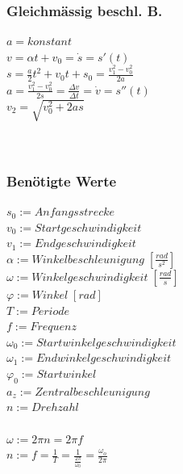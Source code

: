 \begin{multicols}{3}
	\subsubsection{Gleichmässig beschl. B.}
	$a = konstant$ \\
	$v = \alpha t + v_{0} = \dot s = s'(t)$ \\
	$s = \frac{a}{2}t^2 + v_{0}t + s_{0} = \frac{v_{1}^2 - v_{0}^2}{2a}$ \\
	$a = \frac{v_{1}^2 - v_{0}^2}{2s} = \frac{\Delta v}{\Delta t} = \dot v = s''(t)$ \\
	$v_{2} = \sqrt{v_{0}^2 + 2as}$ \\
	\\
	\\
\columnbreak
	\subsubsection{Benötigte Werte}
	$s_{0}:= Anfangsstrecke$ \\
	$v_{0}:= Startgeschwindigkeit$ \\
	$v_{1}:= Endgeschwindigkeit$ \\
	$\alpha:= Winkelbeschleunigung \; [\frac{rad}{s^2}]$ \\
	$\omega:= Winkelgeschwindigkeit \; [\frac{rad}{s}]$ \\
	$\varphi:= Winkel \; [rad]$ \\
	$T:= Periode $\\
	$f:= Frequenz $\\
	$\omega_{0} := Startwinkelgeschwindigkeit $ \\
	$\omega_{1} := Endwinkelgeschwindigkeit $ \\
	$\varphi_{0} := Startwinkel $ \\
	$a_{z} := Zentralbeschleunigung$ \\
	$n := Drehzahl$ \\
	\\
	$ \omega := 2 \pi n = 2 \pi f$ \\
	$ n:= f = \frac{1}{T} = \frac{1}{\frac{2 \pi}{\omega_0}} = \frac{\omega_o}{2\pi}$
\end{multicols}
	
